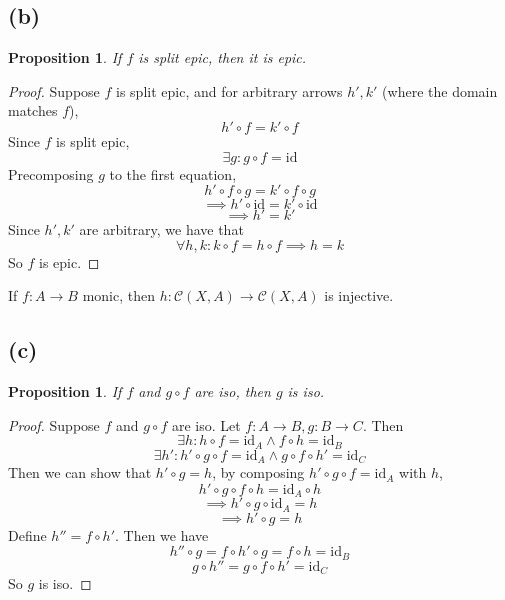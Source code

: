 \documentclass[11pt]{article} %
\newtheorem{proposition}[theorem]{Proposition}
\theoremstyle{definition}
\begin{document}
\subsection*{(b)}
\begin{proposition}
    If $f$ is split epic, then it is epic.
\end{proposition}
\begin{proof}
    Suppose $f$ is split epic, and for arbitrary arrows $h',k'$ (where the domain matches $f$),
    \[h'\circ f = k'\circ f\]
    Since $f$ is split epic,
    \[\exists g: g\circ f=\text{id}\]
    Precomposing $g$ to the first equation,
    \[h'\circ f\circ g = k'\circ f\circ g\]
    \[\implies h'\circ \text{id} = k'\circ \text{id}\]
    \[\implies h' = k'\]
    Since $h',k'$ are arbitrary, we have that
    \[\forall h,k: k\circ f = h\circ f \implies h = k\]
    So $f$ is epic.
\end{proof}
{\color{teal}
If $f:A\rightarrow B$ monic, then $h:\mathcal{C}(X,A)\rightarrow \mathcal{C}(X,A)$ is injective.
}

\subsection*{(c)}
\begin{proposition}
    If $f$ and $g\circ f$ are iso, then $g$ is iso.
\end{proposition}
\begin{proof}
    Suppose $f$ and $g\circ f$ are iso. Let $f:A\rightarrow B,g:B\rightarrow C$.
    Then
    \[\exists h: h\circ f = \text{id}_A \wedge f\circ h = \text{id}_B\]
    \[\exists h': h'\circ g\circ f = \text{id}_A \wedge g\circ f\circ h' = \text{id}_C\]
    Then we can show that $h'\circ g = h$, by composing $h'\circ g\circ f = \text{id}_A$ with $h$,
    \[h'\circ g\circ f \circ h = \text{id}_A \circ h\]
    \[\implies h'\circ g\circ \text{id}_A = h\]
    \[\implies h'\circ g= h\]
    Define $h''=f\circ h'$. Then we have
    \[h'' \circ g = f\circ h' \circ g = f\circ h = \text{id}_B\]
    \[g \circ h'' = g\circ f\circ h' = \text{id}_C\]
    So $g$ is iso.
\end{proof}
\end{document}
